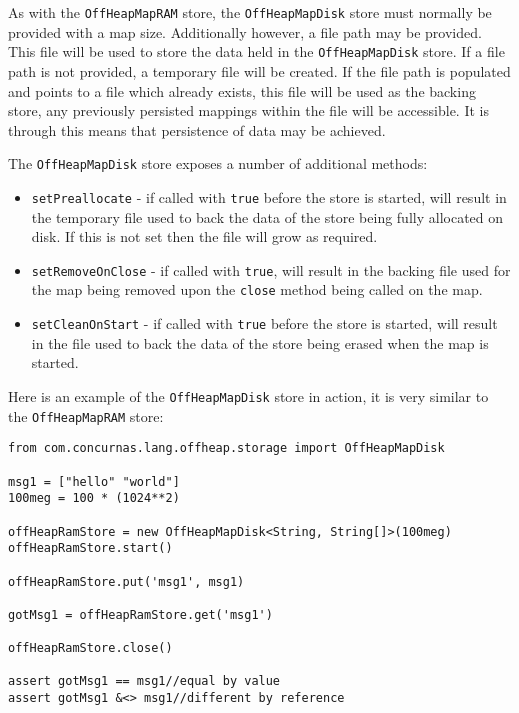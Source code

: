 \documentclass[conc-doc]{subfiles}
\begin{document}
As with the \lstinline{OffHeapMapRAM} store, the \lstinline{OffHeapMapDisk} store must normally be provided with a map size. Additionally however, a file path may be provided. This file will be used to store the data held in the \lstinline{OffHeapMapDisk} store. If a file path is not provided, a temporary file will be created. If the file path is populated and points to a file which already exists, this file will be used as the backing store, any previously persisted mappings within the file will be accessible. It is through this means that persistence of data may be achieved.

The \lstinline{OffHeapMapDisk} store exposes a number of additional methods:

\begin{itemize}
	\item \lstinline{setPreallocate} - if called with \lstinline{true} before the store is started, will result in the temporary file used to back the data of the store being fully allocated on disk. If this is not set then the file will grow as required.
	\item \lstinline{setRemoveOnClose} - if called with \lstinline{true}, will result in the backing file used for the map being removed upon the \lstinline{close} method being called on the map.
	\item \lstinline{setCleanOnStart} - if called with \lstinline{true} before the store is started, will result in the file used to back the data of the store being erased when the map is started.
\end{itemize}

Here is an example of the \lstinline{OffHeapMapDisk} store in action, it is very similar to the \lstinline{OffHeapMapRAM} store:

\begin{lstlisting}
from com.concurnas.lang.offheap.storage import OffHeapMapDisk

msg1 = ["hello" "world"]
100meg = 100 * (1024**2)

offHeapRamStore = new OffHeapMapDisk<String, String[]>(100meg)
offHeapRamStore.start()

offHeapRamStore.put('msg1', msg1)

gotMsg1 = offHeapRamStore.get('msg1')

offHeapRamStore.close()

assert gotMsg1 == msg1//equal by value
assert gotMsg1 &<> msg1//different by reference
\end{lstlisting}
\end{document}
